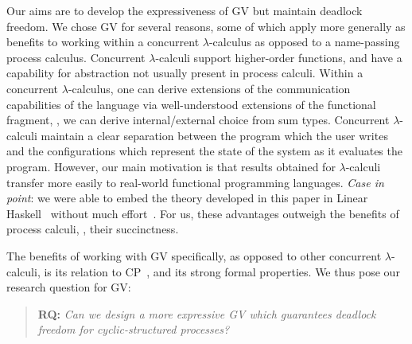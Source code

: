 \documentclass[main.tex]{subfiles}
\begin{document}
Our aims are to develop the expressiveness of GV but maintain deadlock freedom. We chose GV for several reasons, some of which apply more generally as benefits to working within a concurrent $\lambda$-calculus as opposed to a name-passing process calculus. Concurrent $\lambda$-calculi support higher-order functions, and have a capability for abstraction not usually present in process calculi. Within a concurrent $\lambda$-calculus, one can derive extensions of the communication capabilities of the language via well-understood extensions of the functional fragment, \eg, we can derive internal/external choice from sum types. Concurrent $\lambda$-calculi maintain a clear separation between the program which the user writes and the configurations which represent the state of the system as it evaluates the program. However, our main motivation is that results obtained for $\lambda$-calculi transfer more easily to real-world functional programming languages. \emph{Case in point}: we were able to embed the theory developed in this paper in Linear Haskell~\cite{bernardyboespflug18} without much effort~\cite{KD21b}. For us, these advantages outweigh the benefits of process calculi, \eg, their succinctness.

The benefits of working with GV specifically, as opposed to other concurrent $\lambda$-calculi, is its relation to CP~\cite{wadler14}, and its strong formal properties. We thus pose our research question for GV:
\begin{quotation}
\textbf{RQ:} \emph{Can we design a more expressive GV which guarantees deadlock freedom for cyclic-structured processes?}
\end{quotation}
\end{document}
